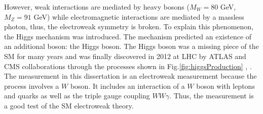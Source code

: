 However, weak interactions are mediated by heavy bosons ($M_W=80$ GeV, $M_Z=91$ GeV) while electromagnetic interactions are mediated by a massless photon, thus, the electroweak symmetry is broken. To explain this phenomenon, the Higgs mechanism was introduced. The mechanism predicted an existence of an additional boson: the Higgs boson. The Higgs boson was a missing piece of the SM for many years and was finally discovered in 2012 at LHC by ATLAS and CMS collaborations through the processes shown in Fig.\ref{fig:higgsProduction} \cite{ref_HiggsPaperCMS}, \cite{ref_HiggsPaperATLAS}.\\


The measurement in this dissertation is an electroweak measurement because the process involves a $W$ boson. It includes an interaction of a $W$ boson with leptons and quarks as well as the triple gauge coupling $WW\gamma$. Thus, the measurement is a good test of the SM electroweak theory.\\ 



